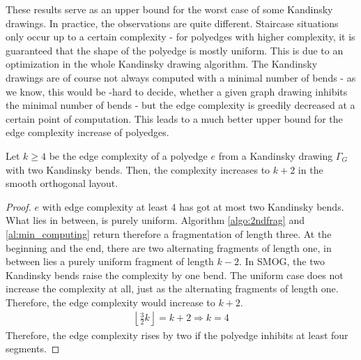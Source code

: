 These results serve as an upper bound for the worst case of some Kandinsky drawings. In practice, the observations are quite different. Staircase situations only occur up to a certain complexity - for polyedges with higher complexity, it is guaranteed that the shape of the polyedge is mostly uniform. This is due to an optimization in the whole Kandinsky drawing algorithm. The Kandinsky drawings are of course not always computed with a minimal number of bends - as we know, this would be \NP-hard to decide, whether a given graph drawing inhibits the minimal number of bends - but the edge complexity is greedily decreased at a certain point of computation. This leads to a much better upper bound for the edge complexity increase of polyedges.
\begin{lemma}
	Let $k \geq 4$ be the edge complexity of a polyedge $e$ from a Kandinsky drawing $\Gamma_G$ with two Kandinsky bends. Then, the complexity increases to $k+2$ in the smooth orthogonal layout. 
\end{lemma}
\begin{proof}
	$e$ with edge complexity at least 4 has got at most two Kandinsky bends. What lies in between, is purely uniform. Algorithm \ref{algo:2ndfrag} and \ref{al:min_computing} return therefore a fragmentation of length three. At the beginning and the end, there are two alternating fragments of length one, in between lies a purely uniform fragment of length $k-2$. In SMOG, the two Kandinsky bends raise the complexity by one bend. The uniform case does not increase the complexity at all, just as the alternating fragments of length one. Therefore, the edge complexity would increase to $k+2$.
	\begin{align*}
		\left\lfloor\frac{3}{2}k\right\rfloor = k + 2 \Rightarrow k = 4
	\end{align*}
	Therefore, the edge complexity rises by two if the polyedge inhibits at least four segments.
\end{proof}